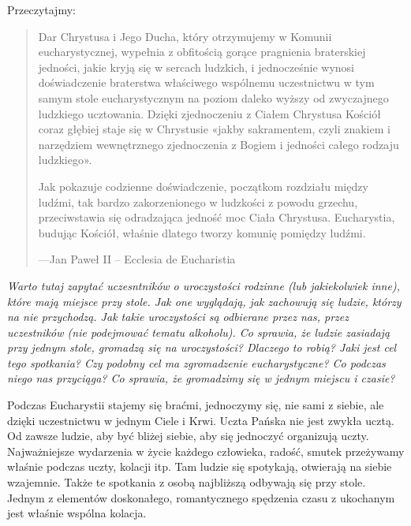 \documentclass[a5paper,10pt,polish]{book}
\begin{document}
Przeczytajmy:
\begin{quote}

Dar Chrystusa i Jego Ducha, który otrzymujemy w Komunii eucharystycznej, wypełnia z obfitością gorące pragnienia braterskiej jedności, jakie kryją się w sercach ludzkich, i jednocześnie wynosi doświadczenie braterstwa właściwego wspólnemu uczestnictwu w tym samym stole eucharystycznym na poziom daleko wyższy od zwyczajnego ludzkiego ucztowania. Dzięki zjednoczeniu z Ciałem Chrystusa Kościół coraz głębiej staje się w Chrystusie «jakby sakramentem, czyli znakiem i narzędziem wewnętrznego zjednoczenia z Bogiem i jedności całego rodzaju ludzkiego».

Jak pokazuje codzienne doświadczenie, początkom rozdziału między ludźmi, tak bardzo zakorzenionego w ludzkości z powodu grzechu, przeciwstawia się odradzająca jedność moc Ciała Chrystusa. Eucharystia, budując Kościół, właśnie dlatego tworzy komunię pomiędzy ludźmi.

\begin{flushright}
---Jan Paweł II -- Ecclesia de Eucharistia
\end{flushright}
\end{quote}

\emph{Warto tutaj zapytać uczesntników o uroczystości rodzinne (lub jakiekolwiek inne), które mają miejsce przy stole. Jak one wyglądają, jak zachowują się ludzie, którzy na nie przychodzą. Jak takie uroczystości są odbierane przez nas, przez uczestników (nie podejmować tematu alkoholu). Co sprawia, że ludzie zasiadają przy jednym stole, gromadzą się na uroczystości? Dlaczego to robią? Jaki jest cel tego spotkania?
Czy podobny cel ma zgromadzenie eucharystyczne? Co podczas niego nas przyciąga? Co sprawia, że gromadzimy się w jednym miejscu i czasie?}

Podczas Eucharystii stajemy się braćmi, jednoczymy się, nie sami z siebie, ale dzięki uczestnictwu w jednym Ciele i Krwi. Uczta Pańska nie jest zwykła ucztą. Od zawsze ludzie, aby być bliżej siebie, aby się jednoczyć organizują uczty. Najważniejsze wydarzenia w
życie każdego człowieka, radość, smutek przeżywamy właśnie podczas uczty, kolacji itp. Tam ludzie się spotykają, otwierają na siebie wzajemnie. Także te spotkania z osobą najbliższą odbywają się przy stole. Jednym z elementów doskonałego, romantycznego spędzenia czasu z ukochanym jest właśnie wspólna kolacja.
\end{document}
